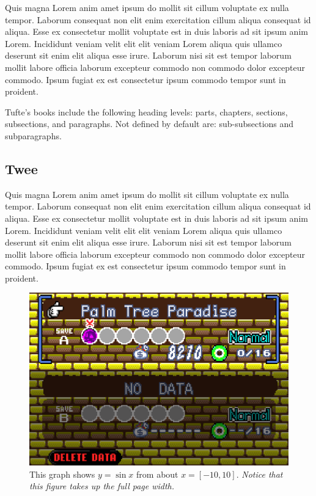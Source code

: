\documentclass[
  english,
  symmetric,justified,marginals=raggedouter]{tufte-book}
\begin{document}
Quis magna Lorem anim amet ipsum do mollit sit cillum voluptate ex nulla
tempor. Laborum consequat non elit enim exercitation cillum aliqua
consequat id aliqua. Esse ex consectetur mollit voluptate est in duis
laboris ad sit ipsum anim Lorem. Incididunt veniam velit elit elit
veniam Lorem aliqua quis ullamco deserunt sit enim elit aliqua esse
irure. Laborum nisi sit est tempor laborum mollit labore officia laborum
excepteur commodo non commodo dolor excepteur commodo. Ipsum fugiat ex
est consectetur ipsum commodo tempor sunt in proident.

Tufte's books include the following heading levels: parts,
chapters, sections, subsections, and paragraphs. Not defined by
default are: sub-subsections and subparagraphs.

\hypertarget{twee}{%
\subsection{Twee}\label{twee}}

Quis magna Lorem anim amet ipsum do mollit sit cillum voluptate ex nulla
tempor. Laborum consequat non elit enim exercitation cillum aliqua
consequat id aliqua. Esse ex consectetur mollit voluptate est in duis
laboris ad sit ipsum anim Lorem. Incididunt veniam velit elit elit
veniam Lorem aliqua quis ullamco deserunt sit enim elit aliqua esse
irure. Laborum nisi sit est tempor laborum mollit labore officia laborum
excepteur commodo non commodo dolor excepteur commodo. Ipsum fugiat ex
est consectetur ipsum commodo tempor sunt in proident.

\begin{figure}[h]
  \includegraphics[width=\linewidth]{wario4.png}%
  \caption{This graph shows $y = \sin x$ from about $x = [-10, 10]$.
  \emph{Notice that this figure takes up the full page width.}}%
  \label{fig:fullfig}%
\end{figure}
\end{document}
